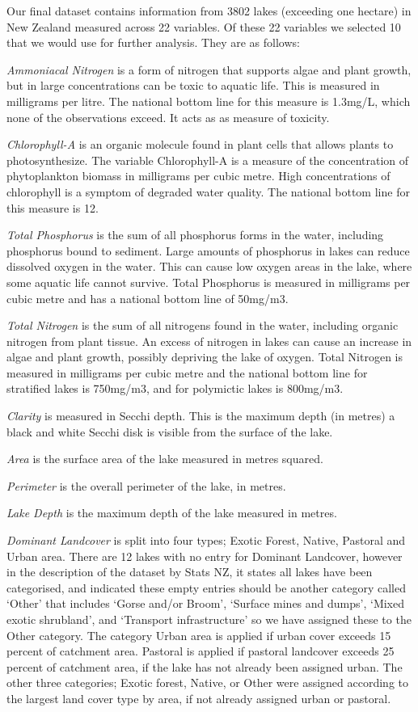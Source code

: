 \documentclass[
]{article}
\begin{document}
Our final dataset contains information from 3802 lakes (exceeding one hectare) in New Zealand measured across 22 variables. Of these 22 variables we selected 10 that we would use for further analysis. They are as follows:

\emph{Ammoniacal Nitrogen} is a form of nitrogen that supports algae and plant growth, but in large concentrations can be toxic to aquatic life. This is measured in milligrams per litre. The national bottom line for this measure is 1.3mg/L, which none of the observations exceed. It acts as as measure of toxicity.

\emph{Chlorophyll-A} is an organic molecule found in plant cells that allows plants to photosynthesize. The variable Chlorophyll-A is a measure of the concentration of phytoplankton biomass in milligrams per cubic metre. High concentrations of chlorophyll is a symptom of degraded water quality. The national bottom line for this measure is 12.

\emph{Total Phosphorus} is the sum of all phosphorus forms in the water, including phosphorus bound to sediment. Large amounts of phosphorus in lakes can reduce dissolved oxygen in the water. This can cause low oxygen areas in the lake, where some aquatic life cannot survive. Total Phosphorus is measured in milligrams per cubic metre and has a national bottom line of 50mg/m3.

\emph{Total Nitrogen} is the sum of all nitrogens found in the water, including organic nitrogen from plant tissue. An excess of nitrogen in lakes can cause an increase in algae and plant growth, possibly depriving the lake of oxygen. Total Nitrogen is measured in milligrams per cubic metre and the national bottom line for stratified lakes is 750mg/m3, and for polymictic lakes is 800mg/m3.

\emph{Clarity} is measured in Secchi depth. This is the maximum depth (in metres) a black and white Secchi disk is visible from the surface of the lake.

\emph{Area} is the surface area of the lake measured in metres squared.

\emph{Perimeter} is the overall perimeter of the lake, in metres.

\emph{Lake Depth} is the maximum depth of the lake measured in metres.

\emph{Dominant Landcover} is split into four types; Exotic Forest, Native, Pastoral and Urban area. There are 12 lakes with no entry for Dominant Landcover, however in the description of the dataset by Stats NZ, it states all lakes have been categorised, and indicated these empty entries should be another category called `Other' that includes `Gorse and/or Broom', `Surface mines and dumps', `Mixed exotic shrubland', and `Transport infrastructure' so we have assigned these to the Other category. The category Urban area is applied if urban cover exceeds 15 percent of catchment area. Pastoral is applied if pastoral landcover exceeds 25 percent of catchment area, if the lake has not already been assigned urban. The other three categories; Exotic forest, Native, or Other were assigned according to the largest land cover type by area, if not already assigned urban or pastoral.
\end{document}
